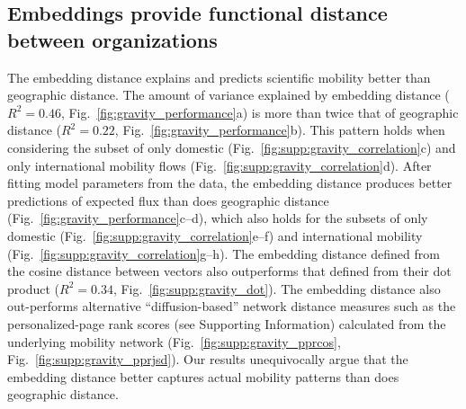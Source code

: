 \documentclass[12pt]{article} %
\def\SI{Supporting Information}
\begin{document}
%
%
%
\subsection*{Embeddings provide functional distance between organizations}

The embedding distance explains and predicts scientific mobility better than geographic distance.
The amount of variance explained by embedding distance ($R^{2} = 0.46$, Fig.~\ref{fig:gravity_performance}a) is more than twice that of geographic distance ($R^{2} = 0.22$, Fig.~\ref{fig:gravity_performance}b).
This pattern holds when considering the subset of only domestic (Fig.~\ref{fig:supp:gravity_correlation}c) and only international mobility flows (Fig.~\ref{fig:supp:gravity_correlation}d).
After fitting model parameters from the data, the embedding distance produces better predictions of expected flux than does geographic distance (Fig.~\ref{fig:gravity_performance}c--d), which also holds for the subsets of only domestic (Fig.~\ref{fig:supp:gravity_correlation}e--f) and international mobility (Fig.~\ref{fig:supp:gravity_correlation}g--h).
The embedding distance defined from the cosine distance between vectors also outperforms that defined from their dot product ($R^{2} = 0.34$, Fig.~\ref{fig:supp:gravity_dot}).
The embedding distance also out-performs alternative ``diffusion-based'' network distance measures such as the personalized-page rank scores (see \SI) calculated from the underlying mobility network (Fig.~\ref{fig:supp:gravity_pprcos}, Fig.~\ref{fig:supp:gravity_pprjsd}).
Our results unequivocally argue that the embedding distance better captures actual mobility patterns than does geographic distance.
\end{document}
